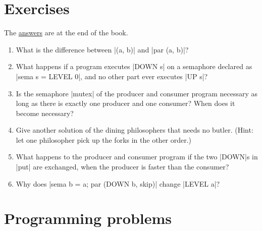 \section*{Exercises}

The \hyperref[ans-ch8]{answers} are at the end of the book.

\begin{enumerate}
\item What is the difference between \code|(a, b)| and \code|par (a, b)|?
\item What happens if a program executes \code|DOWN s| on a semaphore
  declared as \code|sema s = LEVEL 0|, and no other part ever executes
  \code|UP s|?
\item Is the semaphore \code|mutex| of the producer and consumer program
  necessary as long as there is exactly one producer and one consumer?
  When does it become necessary?
\item Give another solution of the dining philosophers that needs no
  butler. (Hint: let one philosopher pick up the forks in the other
  order.)
\item What happens to the producer and consumer program if the two
  \code|DOWN|s in \code|put| are exchanged, when the producer is faster
  than the consumer?
\item Why does \code|sema b = a; par (DOWN b, skip)| change
  \code|LEVEL a|?
\end{enumerate}

\section*{Programming problems}

